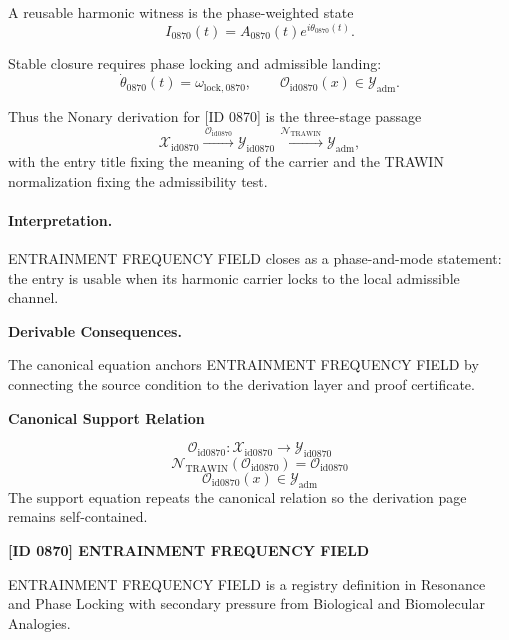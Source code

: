A reusable harmonic witness is the phase-weighted state\[
I_{0870}(t)=A_{0870}(t)e^{i\theta_{0870}(t)}.
\]

Stable closure requires phase locking and admissible landing:\[
\dot{\theta}_{0870}(t)=\omega_{\mathrm{lock},0870},\qquad \mathcal{O}_{\mathrm{id0870}}(x)\in\mathcal{Y}_{\mathrm{adm}}.
\]

Thus the Nonary derivation for [ID 0870] is the three-stage passage
\[
\mathcal{X}_{\mathrm{id0870}}\xrightarrow{\,\mathcal{O}_{\mathrm{id0870}}\,} \mathcal{Y}_{\mathrm{id0870}}\xrightarrow{\,\mathcal{N}_{\mathrm{TRAWIN}}\,} \mathcal{Y}_{\mathrm{adm}},
\]
with the entry title fixing the meaning of the carrier and the TRAWIN normalization fixing the admissibility test.

\paragraph{Interpretation.} ENTRAINMENT FREQUENCY FIELD closes as a phase-and-mode statement: the entry is usable when its harmonic carrier locks to the local admissible channel.

\par\vspace{0.35em}
\noindent\textbf{Derivable Consequences.}\quad
\begingroup
\footnotesize
\raggedright
The canonical equation anchors ENTRAINMENT FREQUENCY FIELD by connecting the source condition to the derivation layer and proof certificate.
\par\endgroup

\noindent\textbf{Canonical Support Relation}\par
\[
\mathcal{O}_{\mathrm{id0870}}:\mathcal{X}_{\mathrm{id0870}}\longrightarrow\mathcal{Y}_{\mathrm{id0870}}
\]
\[
\mathcal{N}_{\mathrm{TRAWIN}}(\mathcal{O}_{\mathrm{id0870}})=\mathcal{O}_{\mathrm{id0870}}
\]
\[
\mathcal{O}_{\mathrm{id0870}}(x)\in\mathcal{Y}_{\mathrm{adm}}
\]
\noindent The support equation repeats the canonical relation so the derivation page remains self-contained.\par

\clearpage
\noindent\textbf{[ID 0870] ENTRAINMENT FREQUENCY FIELD}\par
\vspace{0.35em}
\begingroup\small
{}
ENTRAINMENT FREQUENCY FIELD is a registry definition in Resonance and Phase Locking with secondary pressure from Biological and Biomolecular Analogies.


